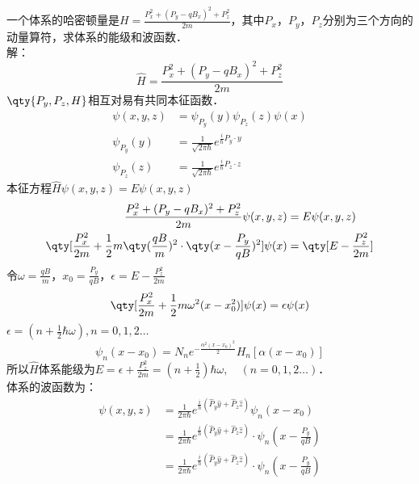 \subsection{ }
一个体系的哈密顿量是$H=\frac{P^2_x+(P_y-qB_x)^2+P^2_z}{2m}$，其中$P_x$，$P_y$，$P_z$分别为三个方向的动量算符，求体系的能级和波函数．\\
解：
\begin{equation}
\hat{H}=\frac{P^2_x+(P_y-qB_x)^2+P^2_z}{2m}
\end{equation}
$\qty{P_y,P_z,H}$相互对易有共同本征函数．\\
\begin{equation}
\begin{aligned}
\psi(x,y,z)&=\psi_{P_y}(y)\psi_{P_z}(z)\psi(x)\\
\psi_{P_y}(y)&=\frac{1}{\sqrt{2\pi\hbar}}e^{\frac{i}{\hbar}P_{y} \cdot y}\\
\psi_{P_z}(z)&=\frac{1}{\sqrt{2\pi\hbar}}e^{\frac{i}{\hbar}P_{z} \cdot z}
\end{aligned}
\end{equation}
本征方程$\hat{H}\psi(x,y,z)=E\psi(x,y,z) $\\
\begin{equation}
\begin{aligned}
\frac{P^2_x+(P_y-qB_x)^2+P^2_z}{2m}\psi(x,y,z)&=E\psi(x,y,z)\\
\qty[\frac{P^2_x}{2m}+\frac{1}{2}m\qty(\frac{qB}{m})^2\cdot \qty(x-\frac{P_y}{qB})^2]\psi(x)&=\qty[E-\frac{P^2_z}{2m}]\\
\end{aligned}
\end{equation}
令$\omega=\frac{qB}{m}$，$x_0=\frac{P_y}{qB}$，$\epsilon=E-\frac{P^2_z}{2m}$
\begin{equation}
\qty[\frac{P^2_x}{2m}+\frac{1}{2}m\omega^2(x-x^2_0)]\psi(x)=\epsilon\psi(x) 
\end{equation}
$\epsilon=(n+\frac{1}{2}\hbar\omega),n=0,1,2\dots$
\begin{equation}
\psi_n(x-x_0)=N_ne^{-\frac{\alpha^2(x-x_0)^2}{2}}H_n[\alpha(x-x_0)]
\end{equation}
所以$\hat{H}$体系能级为$E=\epsilon+\frac{P^2_z}{2m}=(n+\frac{1}{2})\hbar\omega ,\quad (n=0,1,2\dots)$．\\
体系的波函数为：\\
\begin{equation}
\begin{aligned}
\psi(x,y,z)&=\frac{1}{2\pi\hbar}e^{\frac{i}{\hbar}(\hat{P}_{y}\hat{y}+\hat{P}_{z}\hat{z})}\psi_n(x-x_0)\\
&=\frac{1}{2\pi\hbar}e^{\frac{i}{\hbar}(\hat{P}_{y}\hat{y}+\hat{P}_z\hat{z})}\cdot \psi_n(x-\frac{P_y}{qB})\\
&=\frac{1}{2\pi\hbar}e^{\frac{i}{\hbar}(\hat{P}_y\hat{y}+\hat{P}_z\hat{z})}\cdot\psi_n(x-\frac{P_y}{qB})
\end{aligned}
\end{equation}
